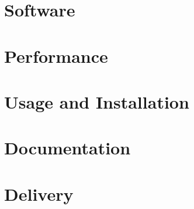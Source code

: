 \documentclass[10pt, a4paper, twoside]{article}
\numberwithin{equation}{subsection}
\numberwithin{figure}{section}
\numberwithin{table}{section}
\begin{document}
\newpage
\section{Software}
\label{sec:software}


\newpage
\section{Performance}
\label{sec:performance}


\newpage
\section{Usage and Installation}
\label{sec:usage}


\newpage
\section{Documentation}
\label{sec:documentation}


\newpage
\section{Delivery}
\label{sec:delivery}



%
%


%
\end{document}
